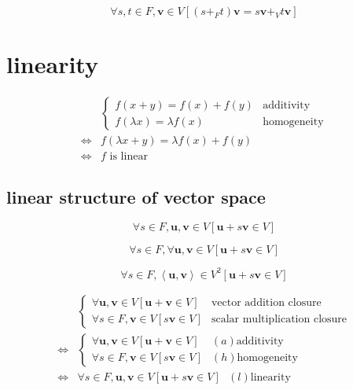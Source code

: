 \documentclass[
]{book}
\theoremstyle{definition}
\theoremstyle{definition}
\theoremstyle{definition}
\theoremstyle{definition}
\theoremstyle{remark}
\begin{document}
\[
\forall s,t\in F,\boldsymbol{v}\in V\left[\left(s+_{{\scriptscriptstyle F}}t\right)\boldsymbol{v}=s\boldsymbol{v}+_{{\scriptscriptstyle V}}t\boldsymbol{v}\right]
\]

\section{linearity}\label{linearity}

\[
\begin{aligned}
 & \begin{cases}
f\left(x+y\right)=f\left(x\right)+f\left(y\right) & \text{additivity}\\
f\left(\lambda x\right)=\lambda f\left(x\right) & \text{homogeneity}
\end{cases}\\
\Leftrightarrow & f\left(\lambda x+y\right)=\lambda f\left(x\right)+f\left(y\right)\\
\Leftrightarrow & f\text{ is linear}
\end{aligned}
\]

\subsection{linear structure of vector space}\label{linear-structure-of-vector-space}

\[
\forall s\in F,\boldsymbol{u},\boldsymbol{v}\in V\left[\boldsymbol{u}+s\boldsymbol{v}\in V\right]
\]

\[
\forall s\in F,\forall\boldsymbol{u},\boldsymbol{v}\in V\left[\boldsymbol{u}+s\boldsymbol{v}\in V\right]
\]

\[
\forall s\in F,\left\langle \boldsymbol{u},\boldsymbol{v}\right\rangle \in V^{2}\left[\boldsymbol{u}+s\boldsymbol{v}\in V\right]
\]

\[
\begin{aligned}
 & \begin{cases}
\forall\boldsymbol{u},\boldsymbol{v}\in V\left[\boldsymbol{u}+\boldsymbol{v}\in V\right] & \text{vector addition closure}\\
\forall s\in F,\boldsymbol{v}\in V\left[s\boldsymbol{v}\in V\right] & \text{scalar multiplication closure}
\end{cases}\\
\Leftrightarrow & \begin{cases}
\forall\boldsymbol{u},\boldsymbol{v}\in V\left[\boldsymbol{u}+\boldsymbol{v}\in V\right] & \left(a\right)\text{additivity}\\
\forall s\in F,\boldsymbol{v}\in V\left[s\boldsymbol{v}\in V\right] & \left(h\right)\text{homogeneity}
\end{cases}\\
\Leftrightarrow & \forall s\in F,\boldsymbol{u},\boldsymbol{v}\in V\left[\boldsymbol{u}+s\boldsymbol{v}\in V\right]\text{ }\left(l\right)\text{linearity}
\end{aligned}
\]
\end{document}

